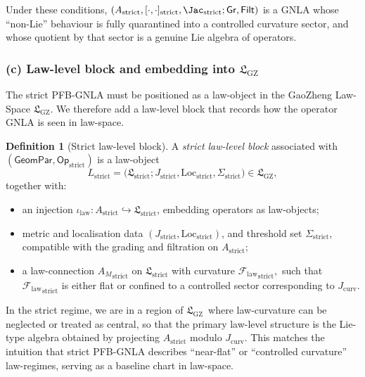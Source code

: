 \documentclass[11pt]{book}
\theoremstyle{plain}
\theoremstyle{definition}
\newtheorem{definition}[theorem]{Definition} \theoremstyle{remark}
\newcommand{\GZLS}{\ensuremath{\mathfrak{L}_{\mathrm{GZ}}}}       \newcommand{\GZLT}{\ensuremath{M_{!w}}}                           \newcommand{\GZLOC}{\ensuremath{A_M}}                             \newcommand{\GZLCurv}{\ensuremath{\mathcal{F}_{\mathrm{law}}}}
\begin{document}
Under these conditions, $(A_{\mathrm{strict}},[\cdot,\cdot]_{\mathrm{strict}},
\Jac_{\mathrm{strict}};\mathsf{Gr},\mathsf{Filt})$ is a GNLA whose
“non-Lie” behaviour is fully quarantined into a controlled curvature
sector, and whose quotient by that sector is a genuine Lie algebra of
operators.



\subsubsection*{(c) Law-level block and embedding into \GZLS}

The strict PFB-GNLA must be positioned as a law-object in the GaoZheng
Law-Space \GZLS. We therefore add a law-level block that records how
the operator GNLA is seen in law-space.

\begin{definition}[Strict law-level block]
A \emph{strict law-level block} associated with \\
  $(\mathsf{GeomPar},\mathsf{Op}_{\mathrm{strict}})$ is a law-object
  \[
     L_{\mathrm{strict}}
     =
     \bigl(
       \mathfrak{L}_{\mathrm{strict}};
       J_{\mathrm{strict}},
       \mathrm{Loc}_{\mathrm{strict}},
       \Sigma_{\mathrm{strict}}
     \bigr)
     \in \GZLS,
  \]
  together with:
  \begin{itemize}
    \item an injection
          \(
             \iota_{\mathrm{law}}:
             A_{\mathrm{strict}}\hookrightarrow
             \mathfrak{L}_{\mathrm{strict}}
          \),
          embedding operators as law-objects;
    \item metric and localisation data
          $(J_{\mathrm{strict}},\mathrm{Loc}_{\mathrm{strict}})$, and
          threshold set $\Sigma_{\mathrm{strict}}$, compatible with
          the grading and filtration on $A_{\mathrm{strict}}$;
    \item a law-connection
          \(
             {\GZLOC}_{\mathrm{strict}}
          \)
          on $\mathfrak{L}_{\mathrm{strict}}$ with curvature
          \(
             {\GZLCurv}_{\mathrm{strict}},
          \)
          such that ${\GZLCurv}_{\mathrm{strict}}$ is either flat or
          confined to a controlled sector corresponding to
          $J_{\mathrm{curv}}$.
  \end{itemize}
\end{definition}

In the strict regime, we are in a region of \GZLS\ where law-curvature
can be neglected or treated as central, so that the primary law-level
structure is the Lie-type algebra obtained by projecting
$A_{\mathrm{strict}}$ modulo $J_{\mathrm{curv}}$. This matches the
intuition that strict PFB-GNLA describes “near-flat” or “controlled
curvature” law-regimes, serving as a baseline chart in law-space.
\end{document}
